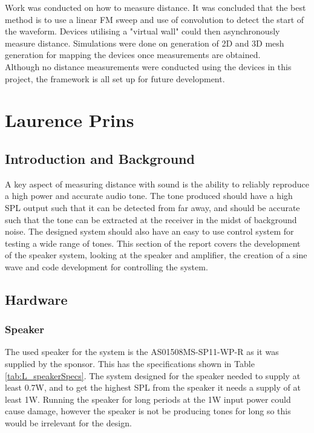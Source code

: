 \documentclass[12pt, a4paper]{article}
\begin{document}
Work was conducted on how to measure distance. It was concluded that the best method is to use a linear FM sweep and use of convolution to detect the start of the waveform. Devices utilising a "virtual wall" could then asynchronously measure distance. Simulations were done on generation of 2D and 3D mesh generation for mapping the devices once measurements are obtained. \\

Although no distance measurements were conducted using the devices in this project, the framework is all set up for future development. \\
\pagebreak
\section{Laurence Prins}
\subsection{Introduction and Background}
A key aspect of measuring distance with sound is the ability to reliably reproduce a high power and accurate audio tone. The tone produced should have a high SPL output such that it can be detected from far away, and should be accurate such that the tone can be extracted at the receiver in the midst of background noise. The designed system should also have an easy to use control system for testing a wide range of tones. This section of the report covers the development of the speaker system, looking at the speaker and amplifier, the creation of a sine wave and code development for controlling the system.\\
\subsection{Hardware}
\subsubsection{Speaker}
The used speaker for the system is the AS01508MS-SP11-WP-R as it was supplied by the sponsor. This has the specifications shown in Table \ref{tab:L_speakerSpecs}.  The system designed for the speaker needed to supply at least 0.7W, and to get the highest SPL from the speaker it needs a supply of at least 1W. Running the speaker for long periods at the 1W input power could cause damage, however the speaker is not be producing tones for long so this would be irrelevant for the design. \\
\end{document}
